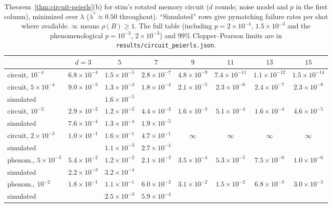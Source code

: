 \begin{table}[h]
\centering\footnotesize\setlength{\tabcolsep}{3.5pt}
\begin{tabular}{lccccccc}
\toprule
& $d=3$ & $5$ & $7$ & $9$ & $11$ & $13$ & $15$\\
\midrule
circuit, $10^{-4}$ & $6.8{\times}10^{-4}$ & $1.5{\times}10^{-5}$ & $2.8{\times}10^{-7}$ & $4.8{\times}10^{-9}$ & $7.4{\times}10^{-11}$ & $1.1{\times}10^{-12}$ & $1.5{\times}10^{-14}$\\
circuit, $5{\times}10^{-4}$ & $9.0{\times}10^{-3}$ & $1.3{\times}10^{-3}$ & $1.8{\times}10^{-4}$ & $2.1{\times}10^{-5}$ & $2.3{\times}10^{-6}$ & $2.4{\times}10^{-7}$ & $2.3{\times}10^{-8}$\\
\quad simulated & & $1.6{\times}10^{-5}$ & & & & & \\
circuit, $10^{-3}$ & $2.9{\times}10^{-2}$ & $1.2{\times}10^{-2}$ & $4.4{\times}10^{-3}$ & $1.6{\times}10^{-3}$ & $5.1{\times}10^{-4}$ & $1.6{\times}10^{-4}$ & $4.6{\times}10^{-5}$\\
\quad simulated & $7.6{\times}10^{-4}$ & $1.3{\times}10^{-4}$ & $1.9{\times}10^{-5}$ & & & & \\
circuit, $2{\times}10^{-3}$ & $1.0{\times}10^{-1}$ & $1.6{\times}10^{-1}$ & $4.7{\times}10^{-1}$ & $\infty$ & $\infty$ & $\infty$ & $\infty$\\
\quad simulated & & $1.1{\times}10^{-3}$ & $2.7{\times}10^{-4}$ & & & & \\
phenom., $5{\times}10^{-3}$ & $5.4{\times}10^{-2}$ & $1.2{\times}10^{-2}$ & $2.1{\times}10^{-3}$ & $3.5{\times}10^{-4}$ & $5.3{\times}10^{-5}$ & $7.5{\times}10^{-6}$ & $1.0{\times}10^{-6}$\\
\quad simulated & $2.2{\times}10^{-3}$ & $3.2{\times}10^{-4}$ & & & & & \\
phenom., $10^{-2}$ & $1.8{\times}10^{-1}$ & $1.1{\times}10^{-1}$ & $6.0{\times}10^{-2}$ & $3.1{\times}10^{-2}$ & $1.5{\times}10^{-2}$ & $6.8{\times}10^{-3}$ & $3.0{\times}10^{-3}$\\
\quad simulated & & $2.5{\times}10^{-3}$ & $5.9{\times}10^{-4}$ & & & & \\
\bottomrule
\end{tabular}
\caption{Theorem~\ref{thm:circuit-peierls}(b) for stim's rotated memory circuit ($d$ rounds; noise model and $p$ in the first column), minimized over $\lambda$ ($\lambda^\ast\approx0.50$ throughout). ``Simulated'' rows give pymatching failure rates per shot where available. $\infty$ means $\rho(B)\ge1$. The full table (including $p=2\times10^{-4}$, $1.5\times10^{-3}$ and the phenomenological $p=10^{-3}$, $2\times10^{-3}$) and 99\% Clopper--Pearson limits are in \texttt{results/circuit\_peierls.json}.}\label{tab:circuit-peierls}
\end{table}

